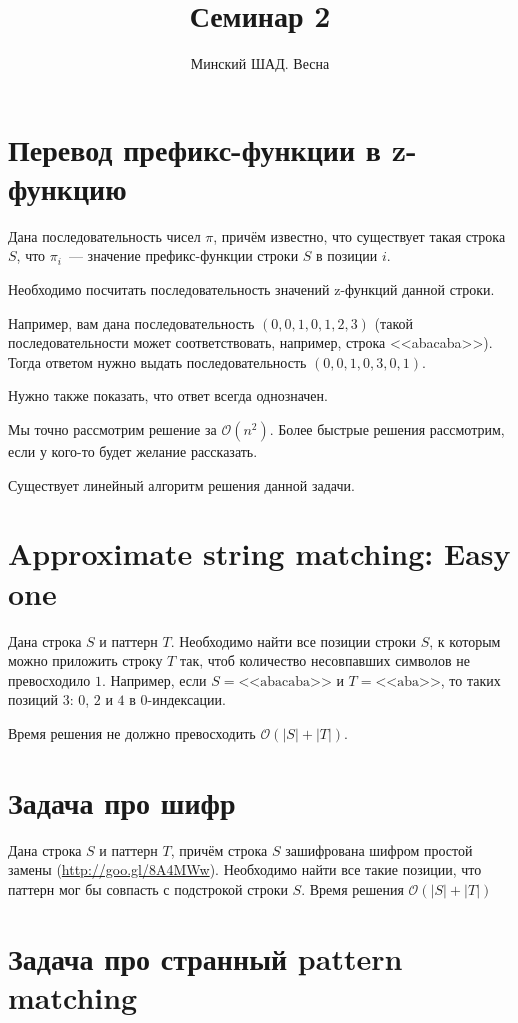 \documentclass[addpoints]{exam}
\title{Семинар 2}
\author{Минский ШАД. Весна}
\begin{document}
\maketitle

\section{Перевод префикс-функции в z-функцию}

Дана последовательность чисел $\pi$, причём известно, что существует такая строка $S$, что $\pi_i$~--- значение префикс-функции строки $S$ в позиции $i$.

Необходимо посчитать последовательность значений z-функций данной строки.

Например, вам дана последовательность $(0, 0, 1, 0, 1, 2, 3)$  (такой последовательности может соответствовать, например, строка <<abacaba>>). Тогда ответом нужно выдать последовательность $(0, 0, 1, 0, 3, 0, 1)$.

Нужно также показать, что ответ всегда однозначен.

Мы точно рассмотрим решение за $\mathcal{O}(n^2)$. Более быстрые решения рассмотрим, если у кого-то будет желание рассказать.

Существует линейный алгоритм решения данной задачи.

\section{Approximate string matching: Easy one}

Дана строка $S$ и паттерн $T$. Необходимо найти все позиции строки $S$, к которым можно приложить строку $T$ так, чтоб количество несовпавших символов не превосходило $1$. Например, если $S=\mbox{<<abacaba>>}$ и $T=\mbox{<<aba>>}$, то таких позиций $3$: $0$, $2$ и $4$ в $0$-индексации.

Время решения не должно превосходить $\mathcal{O}(|S| + |T|)$.

\section{Задача про шифр}

Дана строка $S$ и паттерн $T$, причём строка $S$ зашифрована шифром простой замены (\url{http://goo.gl/8A4MWw}). Необходимо найти все такие позиции, что паттерн мог бы совпасть с подстрокой строки $S$. Время решения $\mathcal{O}(|S| + |T|)$ 

\section{Задача про странный pattern matching}
\end{document}
